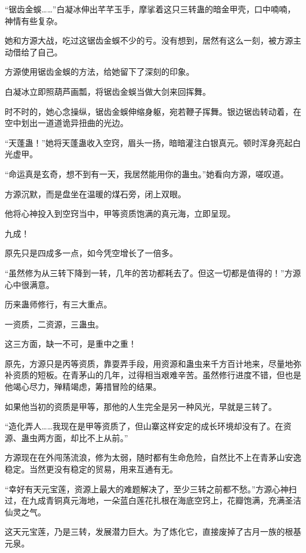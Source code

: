 
\begin{this_body}

“锯齿金蜈……”白凝冰伸出芊芊玉手，摩挲着这只三转蛊的暗金甲壳，口中喃喃，神情有些复杂。

她和方源大战，吃过这锯齿金蜈不少的亏。没有想到，居然有这么一刻，被方源主动借给了自己。

方源使用锯齿金蜈的方法，给她留下了深刻的印象。

白凝冰立即照葫芦画瓢，将锯齿金蜈当做大剑来回挥舞。

时不时的，她心念操纵，锯齿金蜈伸缩身躯，宛若鞭子挥舞。银边锯齿转动着，在空中划出一道道诡异扭曲的光边。

“天蓬蛊！”她将天蓬蛊收入空窍，眉头一扬，暗暗灌注白银真元。顿时浑身亮起白光虚甲。

“命运真是玄奇，想不到有一天，我居然能用你的蛊虫。”她看向方源，嗟叹道。

方源沉默，而是盘坐在温暖的煤石旁，闭上双眼。

他将心神投入到空窍当中，甲等资质饱满的真元海，立即呈现。

九成！

原先只是四成多一点，如今凭空增长了一倍多。

“虽然修为从三转下降到一转，几年的苦功都耗去了。但这一切都是值得的！”方源心中很满意。

历来蛊师修行，有三大重点。

一资质，二资源，三蛊虫。

这三方面，缺一不可，是重中之重！

原先，方源只是丙等资质，靠耍弄手段，用资源和蛊虫来千方百计地来，尽量地弥补资质的短板。在青茅山的几年，过得相当艰难辛苦。虽然修行进度不错，但也是他竭心尽力，殚精竭虑，筹措冒险的结果。

如果他当初的资质是甲等，那他的人生完全是另一种风光，早就是三转了。

“造化弄人……我现在是甲等资质了，但山寨这样安定的成长环境却没有了。在资源、蛊虫两方面，却比不上从前。”

方源现在在外闯荡流浪，修为太弱，随时都有生命危险，自然比不上在青茅山安逸稳定。当然更没有稳定的贸易，用来互通有无。

“幸好有天元宝莲，资源上最大的难题解决了，至少三转之前都不愁。”方源心神扫过，在九成青铜真元海地，一朵蓝白莲花扎根在海底空窍上，花瓣饱满，充满圣洁仙灵之气。

这天元宝莲，乃是三转，发展潜力巨大。为了炼化它，直接废掉了古月一族的根基元泉。


\end{this_body}
